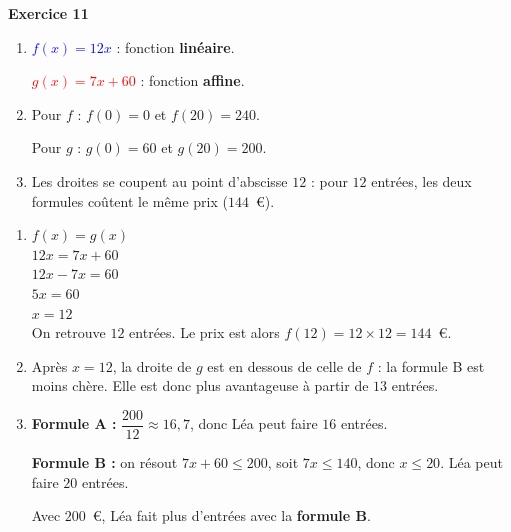 \documentclass[a4paper,11pt]{article}
\newenvironment{exercice}[1]{%
  \Needspace{6\baselineskip}\par\bigskip\noindent\textbf{Exercice #1}\par\smallskip\noindent\ignorespaces
}{%
  \par
}
\begin{document}
\begin{exercice}{11}
\begin{minipage}[c]{0.52\linewidth}
\begin{enumerate}[label=\arabic*.]
\item \textcolor{blue}{$f(x)=12x$} : fonction \textbf{linéaire}.

\textcolor{red}{$g(x)=7x+60$} : fonction \textbf{affine}.
\item Pour $f$ : $f(0)=0$ et $f(20)=240$.

Pour $g$ : $g(0)=60$ et $g(20)=200$.
\item Les droites se coupent au point d'abscisse $12$ : pour $12$ entrées, les deux formules coûtent le même prix ($144$~€).
\end{enumerate}
\end{minipage}
\hfill
\begin{minipage}[c]{0.44\linewidth}
\centering
{}
\end{minipage}

\begin{enumerate}[label=\arabic*., start=4]
\item $f(x)=g(x)$\\
$12x=7x+60$\\
$12x-7x=60$\\
$5x=60$\\
$x=12$\\
On retrouve $12$ entrées. Le prix est alors $f(12)=12\times 12=144$~€.
\item Après $x=12$, la droite de $g$ est en dessous de celle de $f$ : la formule B est moins chère. Elle est donc plus avantageuse à partir de $13$ entrées.
\item \textbf{Formule A :} $\dfrac{200}{12}\approx 16{,}7$, donc Léa peut faire $16$ entrées.

\textbf{Formule B :} on résout $7x+60\leqslant 200$, soit $7x\leqslant 140$, donc $x\leqslant 20$. Léa peut faire $20$ entrées.

Avec $200$~€, Léa fait plus d'entrées avec la \textbf{formule B}.
\end{enumerate}
\end{exercice}
\end{document}
